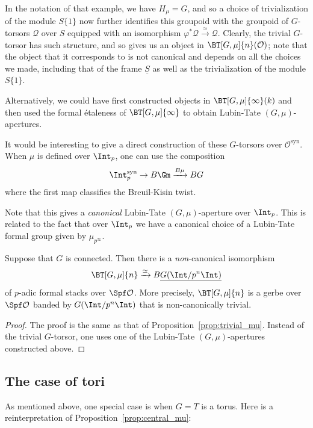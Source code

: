 \documentclass[10pt]{amsart}
\begin{document}
In the notation of that example, we have $H_\mu = G$, and so a choice of trivialization of the module $S\{1\}$ now further identifies this groupoid with the groupoid of $G$-torsors $\mathcal{Q}$ over $S$ equipped with an isomorphism $\varphi^* \mathcal{Q}\xrightarrow{\simeq}\mathcal{Q}$. Clearly, the trivial $G$-torsor has such structure, and so gives us an object in $\BT[G,\mu]{n}(\mathcal{O})$; note that the object that it corresponds to is not canonical and depends on all the choices we made, including that of the frame $\underline{S}$ as well as the trivialization of the module $S\{1\}$.

\begin{remark}
Alternatively, we could have first constructed objects in $\BT[G,\mu]{\infty}(k)$ and then used the formal \'etaleness of $\BT[G,\mu]{\infty}$ to obtain Lubin-Tate $(G,\mu)$-apertures.
\end{remark}

\begin{remark}
\label{rem:direct_construction_Tmu}
It would be interesting to give a direct construction of these $G$-torsors over $\mathcal{O}^{\mathrm{syn}}$. When $\mu$ is defined over $\Int_p$, one can use the composition
\[
\Int_p^{\mathrm{syn}}\to B\Gm\xrightarrow{B\mu}BG
\]
where the first map classifies the Breuil-Kisin twist. 

Note that this gives a \emph{canonical} Lubin-Tate $(G,\mu)$-aperture over $\Int_p$. This is related to the fact that over $\Int_p$ we have a canonical choice of a Lubin-Tate formal group given by $\mu_{p^\infty}$.
\end{remark}



\begin{proposition}
\label{prop:central_mu}
Suppose that $G$ is connected. Then there is a \emph{non}-canonical isomorphism
\[
\BT[G,\mu]{n}\xrightarrow{\simeq}B\underline{G(\Int/p^n\Int)}
\]
of $p$-adic formal stacks over $\Spf \mathcal{O}$. More precisely, $\BT[G,\mu]{n}$ is a gerbe over $\Spf\mathcal{O}$ banded by $G(\Int/p^n\Int)$ that is non-canonically trivial.
\end{proposition}
\begin{proof}
The proof is the same as that of Proposition~\ref{prop:trivial_mu}. Instead of the trivial $G$-torsor, one uses one of the Lubin-Tate $(G,\mu)$-apertures constructed above.
\end{proof}


\subsection{The case of tori}
\label{subsec:tori}
As mentioned above, one special case is when $G = T$ is a torus. Here is a reinterpretation of Proposition~\ref{prop:central_mu}:
\end{document}
